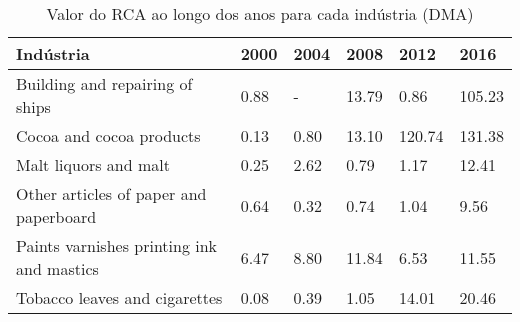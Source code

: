 \begin{table}
\centering
\caption{Valor do RCA ao longo dos anos para cada indústria (DMA)}
\begin{tabular}{p{6cm}p{1.5cm}p{1.5cm}p{1.5cm}p{1.5cm}p{1.5cm}}
\toprule
                                Indústria & 2000 & 2004 &  2008 &   2012 &   2016 \\
\midrule
          Building and repairing of ships & 0.88 &    - & 13.79 &   0.86 & 105.23 \\
                 Cocoa and cocoa products & 0.13 & 0.80 & 13.10 & 120.74 & 131.38 \\
                    Malt liquors and malt & 0.25 & 2.62 &  0.79 &   1.17 &  12.41 \\
   Other articles of paper and paperboard & 0.64 & 0.32 &  0.74 &   1.04 &   9.56 \\
Paints varnishes printing ink and mastics & 6.47 & 8.80 & 11.84 &   6.53 &  11.55 \\
            Tobacco leaves and cigarettes & 0.08 & 0.39 &  1.05 &  14.01 &  20.46 \\
\bottomrule
\end{tabular}
\end{table}
